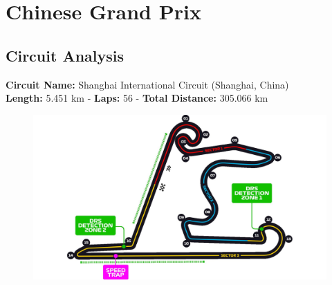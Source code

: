 \section{Chinese Grand Prix}

\subsection{Circuit Analysis}

\textbf{Circuit Name:} Shanghai International Circuit (Shanghai, China) \\
\textbf{Length:} 5.451 km - \textbf{Laps:} 56 - \textbf{Total Distance:} 305.066 km

\begin{figure}[H]
    \centering
    \includegraphics[width=0.75\linewidth]{images/5.China_Circuit.jpg}
\end{figure}

